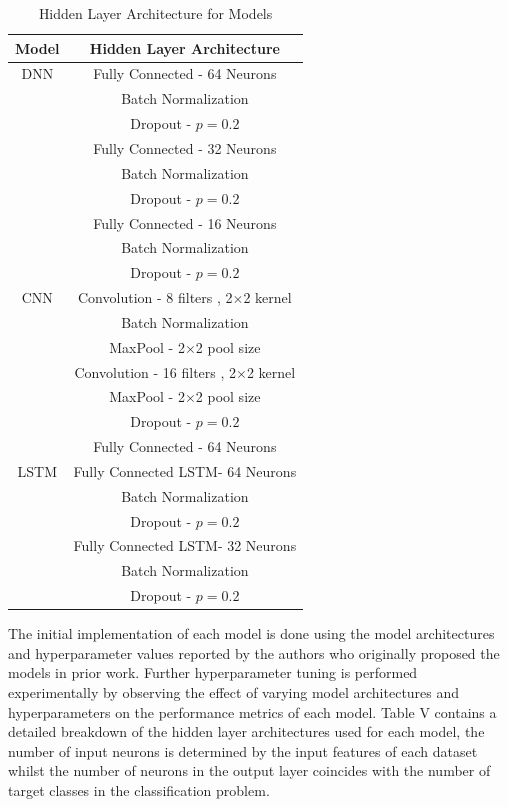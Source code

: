 \documentclass[conference]{IEEEtran}
\begin{document}
\begin{table}[htbp]
\caption{Hidden Layer Architecture for Models}
\begin{center}
\begin{tabular}{|c|c|}
\hline
\textbf{Model} & \textbf{Hidden Layer Architecture}\\[2pt]
\hline
DNN & Fully Connected -  64 Neurons\\[2pt]
    & Batch Normalization\\[2pt]
    & Dropout - $p=0.2$\\[2pt]
    & Fully Connected -  32 Neurons\\[2pt]
    & Batch Normalization \\[2pt]
    & Dropout - $p=0.2$ \\[2pt]
    & Fully Connected -  16 Neurons\\[2pt]
    & Batch Normalization \\[2pt]
    & Dropout - $p=0.2$ \\[2pt]
    
\hline 
CNN & Convolution -  8 filters , 2$\times$2 kernel\\[2pt]
    & Batch Normalization\\[2pt]
    & MaxPool - 2$\times$2 pool size\\[2pt]
    & Convolution -  16 filters , 2$\times$2 kernel\\[2pt]
    & MaxPool - 2$\times$2 pool size\\[2pt]
    & Dropout - $p=0.2$ \\[2pt]
    & Fully Connected -  64 Neurons \\[2pt]
\hline 
LSTM & Fully Connected LSTM-  64 Neurons\\[2pt]
    & Batch Normalization\\[2pt]
    & Dropout - $p=0.2$\\[2pt]
    & Fully Connected LSTM-  32 Neurons\\[2pt]
    & Batch Normalization \\[2pt]
    & Dropout - $p=0.2$ \\[2pt]
\hline
\end{tabular}
\label{tab1}
\end{center}
\end{table}

The initial implementation of each model is done using the model architectures and hyperparameter values reported by the authors who originally proposed the models in prior work. Further hyperparameter tuning is performed experimentally by observing the effect of varying model architectures and hyperparameters on the performance metrics of each model. Table V contains a detailed breakdown of the hidden layer architectures used for each model, the number of input neurons is determined by the input features of each dataset whilst the number of neurons in the output layer coincides with the number of target classes in the classification problem. 
\end{document}
